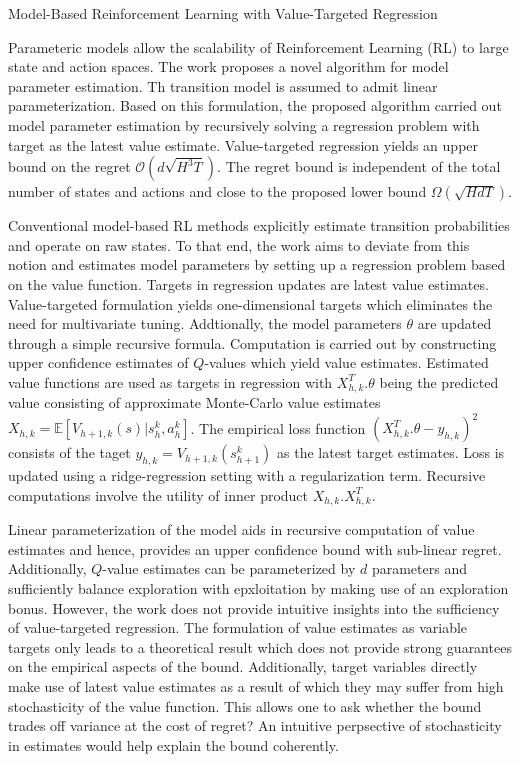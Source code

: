 \documentclass[12pt,letterpaper]{article}
\begin{document}
\begin{center}
  \large{Model-Based Reinforcement Learning with Value-Targeted Regression}
\end{center}

Parameteric models allow the scalability of Reinforcement Learning (RL) to large state and action spaces. The work proposes a novel algorithm for model parameter estimation. Th transition model is assumed to admit linear parameterization. Based on this formulation, the proposed algorithm carried out model parameter estimation by recursively solving a regression problem with target as the latest value estimate. Value-targeted regression yields an upper bound on the regret $\mathcal{O}(d\sqrt{H^{3}T})$. The regret bound is independent of the total number of states and actions and close to the proposed lower bound $\Omega(\sqrt{HdT})$.

Conventional model-based RL methods explicitly estimate transition probabilities and operate on raw states. To that end, the work aims to deviate from this notion and estimates model parameters by setting up a regression problem based on the value function. Targets in regression updates are latest value estimates. Value-targeted formulation yields one-dimensional targets which eliminates the need for multivariate tuning. Addtionally, the model parameters $\theta$ are updated through a simple recursive formula. Computation is carried out by constructing upper confidence estimates of $Q$-values which yield value estimates. Estimated value functions are used as targets in regression with $X_{h,k}^T.\theta$ being the predicted value consisting of approximate Monte-Carlo value estimates $X_{h,k} = \mathbb{E}[V_{h+1,k}(s)|s_{h}^{k},a_{h}^{k}]$. The empirical loss function $(X_{h,k}^{T}.\theta - y_{h,k})^{2}$ consists of the taget $y_{h,k} = V_{h+1,k}(s_{h+1}^{k})$ as the latest target estimates. Loss is updated using a ridge-regression setting with a regularization term. Recursive computations involve the utility of inner product $X_{h,k}.X_{h,k}^{T}$. 

Linear parameterization of the model aids in recursive computation of value estimates and hence, provides an upper confidence bound with sub-linear regret. Additionally, $Q$-value estimates can be parameterized by $d$ parameters and sufficiently balance exploration with epxloitation by making use of an exploration bonus. However, the work does not provide intuitive insights into the sufficiency of value-targeted regression. The formulation of value estimates as variable targets only leads to a theoretical result which does not provide strong guarantees on the empirical aspects of the bound. Additionally, target variables directly make use of latest value estimates as a result of which they may suffer from high stochasticity of the value function. This allows one to ask whether the bound trades off variance at the cost of regret? An intuitive perpsective of stochasticity in estimates would help explain the bound coherently.
\end{document}

